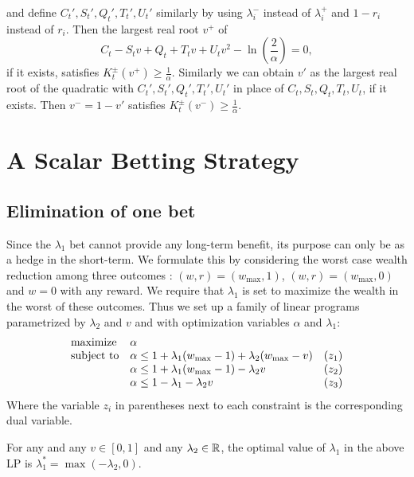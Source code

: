 and define $C_t',S_t',Q_t',T_t',U_t'$ similarly by using $\lambda_i^{-}$ 
instead of $\lambda_i^{+}$ and $1-r_i$ instead of $r_i$. Then
the largest real root $v^{+}$ of
\[
C_t - S_t v + Q_t + T_t v + U_t v^2 - \ln\left(\frac{2}{\alpha}\right) = 0,
\]
if it exists, satisfies $K_t^{\pm}(v^{+})\geq \frac{1}{\alpha}$. Similarly
we can obtain $v'$ as the largest real root of the quadratic
with $C_t',S_t',Q_t',T_t',U_t'$ in place of $C_t,S_t,Q_t,T_t,U_t$,
if it exists. Then $v^{-}=1-v'$ satisfies $K_t^{\pm}(v^{-})\geq \frac{1}{\alpha}$.



\section{A Scalar Betting Strategy}
\subsection{Elimination of one bet} \label{app:betaopt}
Since the $\lambda_1$ bet cannot provide any long-term benefit, its purpose can only be as a hedge in the short-term. We formulate this by considering the
worst case wealth reduction among three outcomes :
$(w,r)=(w_{\max},1)$, 
$(w,r)=(w_{\max},0)$ and $w=0$ with any reward. We require that $\lambda_1$
is set to maximize the wealth in the worst of these outcomes. Thus we set 
up a family of linear programs parametrized by $\lambda_2$ and $v$ and with optimization variables $\alpha$ and $\lambda_1$:
\begin{equation*}
\begin{array}{ll@{}ll}
\text{maximize}  & \alpha &\\
\text{subject to}& \alpha \leq 1+\lambda_1(w_{\max}-1)+\lambda_2(w_{\max}-v)  & &(z_1) \\
                 & \alpha \leq 1+\lambda_1(w_{\max}-1)-\lambda_2 v            & &(z_2) \\
                 & \alpha \leq 1-\lambda_1-\lambda_2 v                        & &(z_3) \\
\end{array}
\end{equation*}
Where the variable $z_i$ in parentheses next to each constraint is the corresponding dual variable. 
\begin{theorem}
For any  and any $v\in [0,1]$ and any $\lambda_2 \in \mathbb{R}$, the optimal value of $\lambda_1$ in the above LP is $\lambda_1^*=\max(-\lambda_2,0)$.
\end{theorem}
